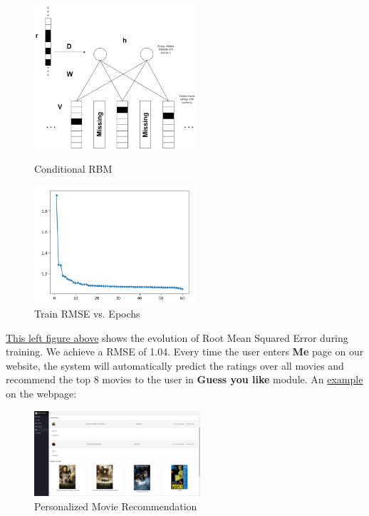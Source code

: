 \begin{CJK*}{UTF8}{gbsn}
\begin{figure}[htbp]
\centering
\label{RBM}
\begin{minipage}[t]{0.45\textwidth}
\centering
\includegraphics[width=6cm]{conditionalRBM.png}
\caption{Conditional RBM}
\end{minipage}
\begin{minipage}[t]{0.45\textwidth}
\centering
\includegraphics[width=6cm]{RBMResult.png}
\caption{Train RMSE vs. Epochs}
\end{minipage}
\end{figure}

\hyperref[RBM]{This left figure above} shows the evolution of Root Mean Squared Error during training. We achieve a RMSE of 1.04. Every time the user enters \textbf{Me} page on our website, the system will automatically predict the ratings over all movies and recommend the top 8 movies to the user in \textbf{Guess you like} module. An \hyperref[recommend]{example} on the webpage:

\begin{figure}[h]
    \centering
    \label{recommend}
    \includegraphics[width = 0.55\textwidth]{recommendation.png}
    \caption{Personalized Movie Recommendation}
\end{figure}


\end{CJK*}
